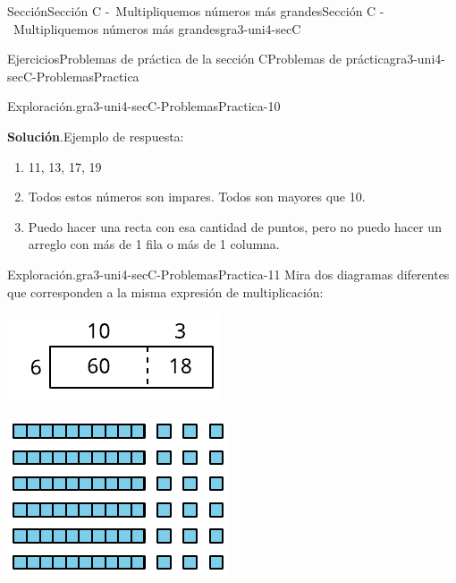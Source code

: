 \documentclass[oneside,10pt,]{article}
\newcommand{\blocktitlefont}{\relax}
\begin{document}
\begin{sectionptx}{Sección}{Sección C -~Multipliquemos números más grandes}{}{Sección C -~Multipliquemos números más grandes}{}{}{gra3-uni4-secC}
\begin{exercises-subsection}{Ejercicios}{Problemas de práctica de la sección C}{}{Problemas de práctica}{}{}{gra3-uni4-secC-ProblemasPractica}
\begin{divisionexercise}{8}{Exploración.}{}{gra3-uni4-secC-ProblemasPractica-10}
\par\smallskip%
\noindent\textbf{\blocktitlefont Solución}.\hypertarget{gra3-uni4-secC-ProblemasPractica-10-3}{}\quad{}Ejemplo de respuesta:%
%
\begin{enumerate}[label={(\alph*)}]
\item{}11, 13, 17, 19%
\item{}Todos estos números son impares. Todos son mayores que 10.%
\item{}Puedo hacer una recta con esa cantidad de puntos, pero no puedo hacer un arreglo con más de 1 fila o más de 1 columna.%
\end{enumerate}
\end{divisionexercise}%
\begin{divisionexercise}{9}{Exploración.}{}{gra3-uni4-secC-ProblemasPractica-11}%
Mira dos diagramas diferentes que corresponden a la misma expresión de multiplicación:%
\begin{sidebyside}{2}{0.025}{0.025}{0.05}%
\begin{sbspanel}{0.45}%
\includegraphics[width=\linewidth]{external/svg-source/tikz-file-151680-scale13.pdf}
\end{sbspanel}%
\begin{sbspanel}{0.45}%
\includegraphics[width=\linewidth]{external/svg-source/tikz-file-151681-scale13.pdf}

\end{sbspanel}
\end{sidebyside}
\end{divisionexercise}
\end{exercises-subsection}
\end{sectionptx}
\end{document}
